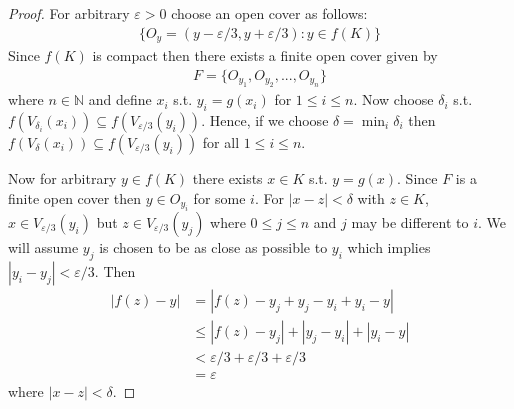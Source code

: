 \begin{proof}
    For arbitrary $\varepsilon>0$ choose an open cover as follows:
    \begin{align*}
        \{ O_y=(y-\varepsilon/3, y+\varepsilon/3) : y\in f(K) \}
    \end{align*}
    Since $f(K)$ is compact then there exists a finite open cover given by
    \begin{align}
        F = \{ O_{y_1},O_{y_2},...,O_{y_n}  \}
    \end{align}
    where $n\in \mathbb{N}$ and define $x_i$ s.t. $y_i = g(x_i)$ for 
    $1 \leq i \leq n$. 
    Now choose $\delta_i$ s.t. 
    $f(V_{\delta_i}(x_i))\subseteq f(V_{\varepsilon/3}(y_i))$. Hence, if we 
    choose $\delta = \min_i \delta_i$ then $f(V_{\delta}(x_i))\subseteq 
    f(V_{\varepsilon/3}(y_i))$ for all $1 \leq i \leq n$.


    Now for arbitrary $y\in f(K)$ there exists $x\in K$ s.t. $y=g(x)$. 
    Since $F$ is a finite open cover then 
    $y \in O_{y_i}$ for some $i$. For $|x-z|<\delta$ with $z\in K$, $x \in V_{\varepsilon/3}(y_i)$
    but $z \in V_{\varepsilon/3}(y_j)$ where $0\leq j \leq n$ and $j$ may be different to 
    $i$. We will assume $y_j$ is chosen to be as close as possible to $y_i$ which implies 
    $|y_i-y_j| < \varepsilon/3$.
    Then
    \begin{align*}
        |f(z)-y| &= |f(z)-y_j+y_j-y_i+y_i-y| \\
                &\leq |f(z)-y_j| + |y_j-y_i| +|y_i-y| \\
                &< \varepsilon/3 + \varepsilon/3 + \varepsilon/3 \\
                &= \varepsilon
    \end{align*}
    where $|x-z| < \delta$.
\end{proof}

